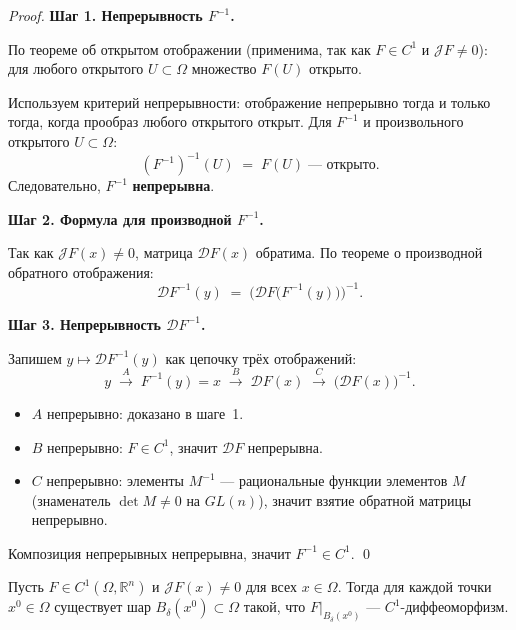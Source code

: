 \begin{proof}
  \textbf{Шаг 1. Непрерывность $F^{-1}$.}

  По теореме об открытом отображении (применима, так как $F \in C^1$
  и $\mathcal{J}F \neq 0$): для любого открытого $U \subset \Omega$
  множество $F(U)$ открыто.

  Используем критерий непрерывности: отображение непрерывно тогда и
  только тогда, когда прообраз любого открытого открыт.
  Для $F^{-1}$ и произвольного открытого $U \subset \Omega$:
  \[
    (F^{-1})^{-1}(U) \;=\; F(U) \;\text{--- открыто.}
  \]
  Следовательно, $F^{-1}$ \textbf{непрерывна}.

  \medskip
  \textbf{Шаг 2. Формула для производной $F^{-1}$.}

  Так как $\mathcal{J}F(x) \neq 0$, матрица $\mathcal{D}F(x)$ обратима.
  По теореме о производной обратного отображения:
  \[
    \mathcal{D}F^{-1}(y)
    \;=\; \bigl(\mathcal{D}F\bigl(F^{-1}(y)\bigr)\bigr)^{-1}.
  \]

  \medskip
  \textbf{Шаг 3. Непрерывность $\mathcal{D}F^{-1}$.}

  Запишем $y \mapsto \mathcal{D}F^{-1}(y)$ как цепочку трёх отображений:
  \[
    y
    \;\xrightarrow{A}\; F^{-1}(y) = x
    \;\xrightarrow{B}\; \mathcal{D}F(x)
    \;\xrightarrow{C}\; \bigl(\mathcal{D}F(x)\bigr)^{-1}.
  \]
  \begin{itemize}
    \item $A$ непрерывно: доказано в шаге~1.
    \item $B$ непрерывно: $F \in C^1$, значит $\mathcal{D}F$ непрерывна.
    \item $C$ непрерывно: элементы $M^{-1}$ --- рациональные функции
          элементов $M$ (знаменатель $\det M \neq 0$ на $GL(n)$),
          значит взятие обратной матрицы непрерывно.
  \end{itemize}
  Композиция непрерывных непрерывна, значит $F^{-1} \in C^1$. \qed
\end{proof}


\begin{theorem}
  \label{theorem:local}
  Пусть $F \in C^1(\Omega, \mathbb{R}^n)$ и
  $\mathcal{J}F(x) \neq 0$ для всех $x \in \Omega$.
  Тогда для каждой точки $x^0 \in \Omega$ существует шар
  $B_\delta(x^0) \subset \Omega$ такой, что
  $F\big|_{B_\delta(x^0)}$ --- $C^1$-диффеоморфизм.
\end{theorem}

